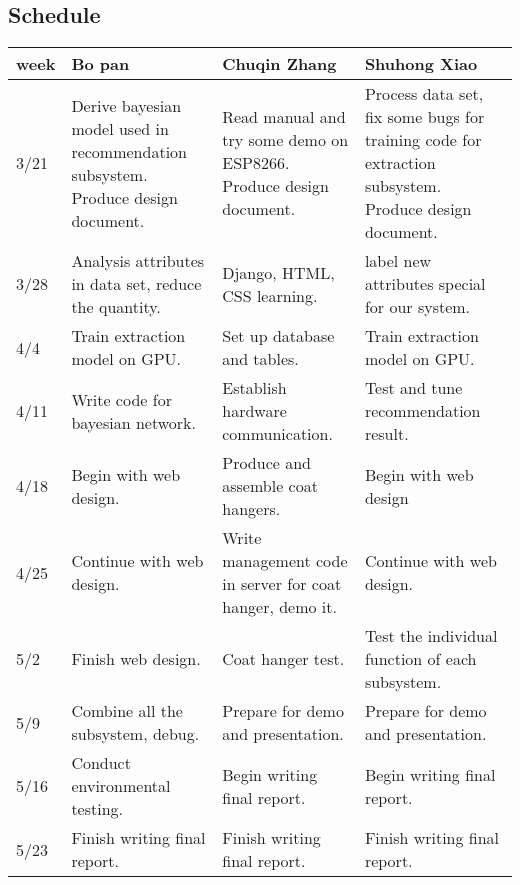 \subsection{Schedule}
\begin{table}[h]
    \centering
    \begin{tabularx}{\textwidth}{|p{1cm}<{\centering}|X|X|X|}
    \hline
    week & Bo pan & Chuqin Zhang & Shuhong Xiao \\
    \hline
    3/21& 
    Derive bayesian model used in recommendation subsystem. Produce design document. 
    & 
    Read manual and try some demo on ESP8266. Produce design document.  
    & 
    Process data set, fix some bugs for training code for extraction subsystem. Produce design document.  \\
    \hline
    3/28&
    Analysis attributes in data set, reduce the quantity. 
    &Django, HTML, CSS learning.  & label new attributes special for our system.  \\
    \hline
    4/4&
    Train extraction model on GPU.
    &Set up database and tables.  &Train extraction model on GPU.  \\
    \hline
    4/11&
    Write code for bayesian network. 
    &Establish hardware communication.  &Test and tune recommendation result.\\
    \hline
    4/18&
    Begin with web design.
    &Produce and assemble coat hangers.  &Begin with web design  \\
    \hline
    4/25&
    Continue with web design.
    &Write management code in server for coat hanger, demo it.  &Continue with web design.  \\
    \hline
    5/2&Finish web design.  &Coat hanger test.  & Test the individual function of each subsystem.\\
    \hline
    5/9&Combine all the subsystem, debug.  &Prepare for demo and presentation.&Prepare for demo and presentation.\\
    \hline
    5/16&
    Conduct environmental testing. 
    &Begin writing final report.  & Begin writing final report. \\
    \hline
    5/23&Finish writing final report.  &Finish writing final report.  & Finish writing final report. \\
    \hline
    \end{tabularx}
\end{table}